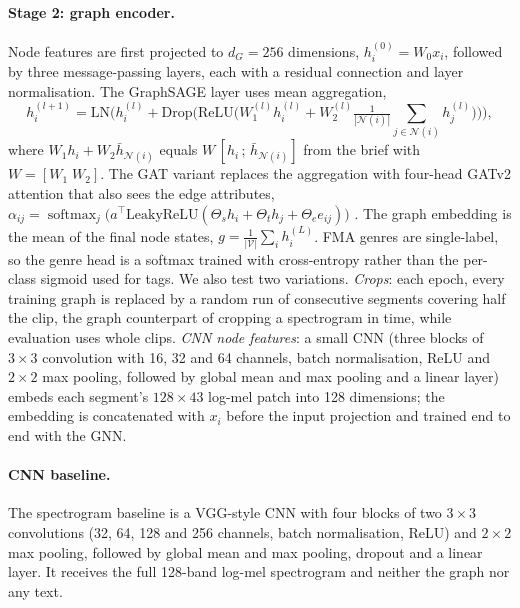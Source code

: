 \documentclass{article}
\begin{document}
\paragraph{Stage 2: graph encoder.}
Node features are first projected to $d_G = 256$ dimensions, $h^{(0)}_i = W_0 x_i$, followed by three message-passing
layers, each with a residual connection and layer normalisation. The GraphSAGE layer uses mean aggregation,
\begin{equation}
  h_i^{(l+1)} = \mathrm{LN}\Big(h_i^{(l)} + \mathrm{Drop}\big(\mathrm{ReLU}\big(W_1^{(l)} h_i^{(l)} + W_2^{(l)}
  \tfrac{1}{|\mathcal{N}(i)|}\textstyle\sum_{j\in\mathcal{N}(i)} h_j^{(l)}\big)\big)\Big),
\end{equation}
where $W_1 h_i + W_2 \bar h_{\mathcal{N}(i)}$ equals $W\,[h_i \,;\, \bar h_{\mathcal{N}(i)}]$ from the brief with
$W = [W_1\; W_2]$. The GAT variant replaces the aggregation with four-head GATv2 attention that also sees the edge
attributes, $\alpha_{ij} = \operatorname{softmax}_j\big(a^\top \mathrm{LeakyReLU}(\Theta_s h_i + \Theta_t h_j + \Theta_e
e_{ij})\big)$ \citep{brody2022gatv2}. The graph embedding is the mean of the final node states,
$g = \frac{1}{|\mathcal{V}|}\sum_i h^{(L)}_i$. FMA genres are single-label, so the genre head is a softmax trained with
cross-entropy rather than the per-class sigmoid used for tags. We also test two variations. \emph{Crops}: each epoch,
every training graph is replaced by a random run of consecutive segments covering half the clip, the graph counterpart
of cropping a spectrogram in time, while evaluation uses whole clips. \emph{CNN node features}: a small CNN (three
blocks of $3\times3$ convolution with 16, 32 and 64 channels, batch normalisation, ReLU and $2\times2$ max pooling,
followed by global mean and max pooling and a linear layer) embeds each segment's $128\times43$ log-mel patch into 128
dimensions; the embedding is concatenated with $x_i$ before the input projection and trained end to end with the GNN.

\paragraph{CNN baseline.}
The spectrogram baseline is a VGG-style CNN with four blocks of two $3\times3$ convolutions (32, 64, 128 and 256
channels, batch normalisation, ReLU) and $2\times2$ max pooling, followed by global mean and max pooling, dropout and a
linear layer. It receives the full 128-band log-mel spectrogram and neither the graph nor any text.
\end{document}
